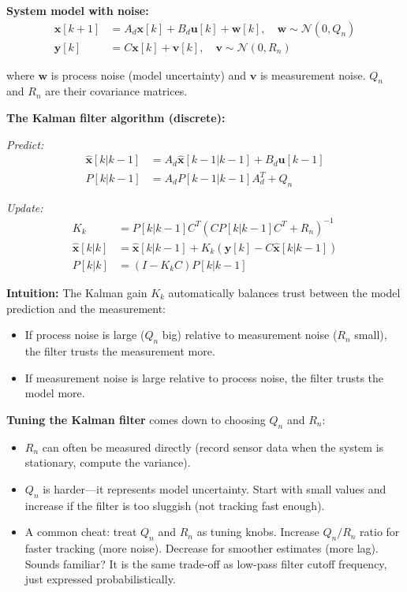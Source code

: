 \textbf{System model with noise:}
\begin{align}
\mathbf{x}[k+1] &= A_d \mathbf{x}[k] + B_d \mathbf{u}[k] + \mathbf{w}[k], \quad \mathbf{w} \sim \mathcal{N}(0, Q_n) \\
\mathbf{y}[k] &= C \mathbf{x}[k] + \mathbf{v}[k], \quad \mathbf{v} \sim \mathcal{N}(0, R_n)
\end{align}

where $\mathbf{w}$ is process noise (model uncertainty) and $\mathbf{v}$ is measurement noise. $Q_n$ and $R_n$ are their covariance matrices.

\textbf{The Kalman filter algorithm (discrete):}

\textit{Predict:}
\begin{align}
\hat{\mathbf{x}}[k|k-1] &= A_d \hat{\mathbf{x}}[k-1|k-1] + B_d \mathbf{u}[k-1] \\
P[k|k-1] &= A_d P[k-1|k-1] A_d^T + Q_n
\end{align}

\textit{Update:}
\begin{align}
K_k &= P[k|k-1] C^T (C P[k|k-1] C^T + R_n)^{-1} \\
\hat{\mathbf{x}}[k|k] &= \hat{\mathbf{x}}[k|k-1] + K_k (\mathbf{y}[k] - C \hat{\mathbf{x}}[k|k-1]) \\
P[k|k] &= (I - K_k C) P[k|k-1]
\end{align}

\textbf{Intuition:} The Kalman gain $K_k$ automatically balances trust between the model prediction and the measurement:
\begin{itemize}
    \item If process noise is large ($Q_n$ big) relative to measurement noise ($R_n$ small), the filter trusts the measurement more.
    \item If measurement noise is large relative to process noise, the filter trusts the model more.
\end{itemize}

\textbf{Tuning the Kalman filter} comes down to choosing $Q_n$ and $R_n$:
\begin{itemize}
    \item $R_n$ can often be measured directly (record sensor data when the system is stationary, compute the variance).
    \item $Q_n$ is harder---it represents model uncertainty. Start with small values and increase if the filter is too sluggish (not tracking fast enough).
    \item A common cheat: treat $Q_n$ and $R_n$ as tuning knobs. Increase $Q_n / R_n$ ratio for faster tracking (more noise). Decrease for smoother estimates (more lag). Sounds familiar? It is the same trade-off as low-pass filter cutoff frequency, just expressed probabilistically.
\end{itemize}

